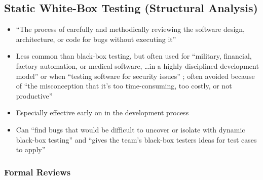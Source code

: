 \subsection{Static White-Box Testing (Structural Analysis)
      \cite[p.~91-104]{patton_software_2006}}

\begin{itemize}
      \item ``The process of carefully and methodically reviewing the software
            design, architecture, or code for bugs without executing it''
            \cite[p.~92]{patton_software_2006}
      \item Less common than black-box testing, but often used for ``military,
            financial, factory automation, or medical software, \dots in a
            highly disciplined development model'' or when ``testing software
            for security issues'' \cite[p.~91]{patton_software_2006}; often
            avoided because of ``the misconception that it's too
            time-consuming, too costly, or not productive''
            \cite[p.~92]{patton_software_2006}
      \item Especially effective early on in the development process
            \cite[p.~92]{patton_software_2006}
      \item Can ``find bugs that would be difficult to uncover or isolate with
            dynamic black-box testing'' and ``gives the team's black-box
            testers ideas for test cases to apply''
            \cite[p.~92]{patton_software_2006}
\end{itemize}

\subsubsection{Formal Reviews \cite[p.~92-95]{patton_software_2006}}

